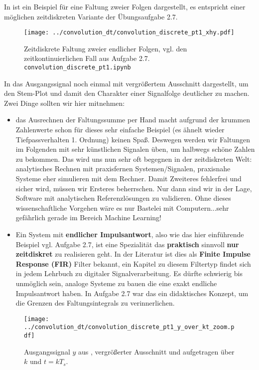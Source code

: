 In  ist ein Beispiel für eine Faltung
zweier Folgen dargestellt, es entspricht einer möglichen zeitdiskreten
Variante der Übungsaufgabe 2.7.
%
\begin{figure}[t]
\centering
\texttt{[image: ../convolution\_dt/convolution\_discrete\_pt1\_xhy.pdf]}
\caption{Zeitdiskrete Faltung zweier endlicher Folgen, vgl. den zeitkontinuierlichen
Fall aus Aufgabe 2.7. \texttt{convolution\_discrete\_pt1.ipynb}}
\label{fig:convolution_discrete_pt1_xhy}
\end{figure}
%
In  das Ausgangssignal noch
einmal mit vergrößertem Ausschnitt dargestellt, um den Stem-Plot und damit den
Charakter einer Signalfolge deutlicher zu machen.
%
Zwei Dinge sollten wir hier mitnehmen:
\begin{itemize}
\item das Ausrechnen der Faltungssumme per Hand macht aufgrund der krummen Zahlenwerte
schon für dieses sehr einfache Beispiel (es ähnelt wieder Tiefpassverhalten 1. Ordnung)
keinen Spaß.
Deswegen werden wir Faltungen im Folgenden mit sehr künstlichen Signalen
üben, um halbwegs schöne Zahlen zu bekommen. Das wird uns nun
sehr oft begegnen in der zeitdiskreten Welt:
analytisches Rechnen mit praxisfernen Systemen/Signalen,
praxisnahe Systeme eher simulieren mit dem Rechner. Damit Zweiteres fehlerfrei und
sicher wird, müssen wir Ersteres beherrschen. Nur dann sind wir in der
Lage, Software mit analytischen Referenzlösungen zu validieren.
Ohne dieses wissenschaftliche Vorgehen wäre es nur Bastelei mit Computern...sehr gefährlich gerade im Bereich Machine Learning!
\item Ein System mit \textbf{endlicher Impulsantwort}, also wie das hier einführende Beispiel
vgl. Aufgabe 2.7, ist eine Spezialität das
\textbf{praktisch} sinnvoll \textbf{nur zeitdiskret} zu realisieren geht. In der Literatur
ist dies als \textbf{Finite Impulse Response (FIR)} Filter bekannt, ein Kapitel
zu diesem Filtertyp findet sich in jedem Lehrbuch zu digitaler Signalverarbeitung.
Es dürfte schwierig bis unmöglich sein, analoge Systeme zu bauen die eine
exakt endliche Impulsantwort haben. In Aufgabe 2.7 war das ein didaktisches
Konzept, um die Grenzen des Faltungsintegrals zu verinnerlichen.
\end{itemize}
%
\begin{figure}[t]
\centering
\texttt{[image: ../convolution\_dt/convolution\_discrete\_pt1\_y\_over\_kt\_zoom.pdf]}
\caption{Ausgangssignal $y$ aus ,
vergrößerter Ausschnitt und aufgetragen über $k$ und $t=k T_s$.}
\label{fig:convolution_discrete_pt1_y_over_kt_zoom}
\end{figure}

